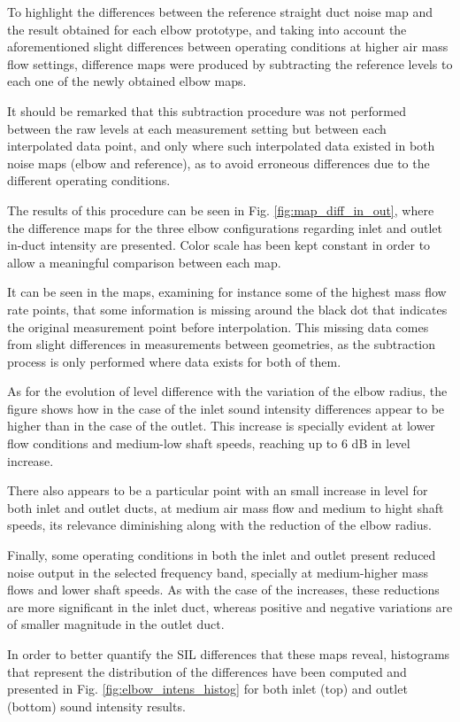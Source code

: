 To highlight the differences between the reference straight duct noise map and the result obtained for each elbow prototype, and taking into account the aforementioned slight differences between operating conditions at higher air mass flow settings, difference maps were produced by subtracting the reference levels to each one of the newly obtained elbow maps.

It should be remarked that this subtraction procedure was not performed between the raw levels at each measurement setting but between each interpolated data point, and only where such interpolated data existed in both noise maps (elbow and reference), as to avoid erroneous differences due to the different operating conditions. 

The results of this procedure can be seen in Fig. \ref{fig:map_diff_in_out}, where the difference maps for the three elbow configurations regarding inlet and outlet in-duct intensity are presented. Color scale has been kept constant in order to allow a meaningful comparison between each map.

It can be seen in the maps, examining for instance some of the highest mass flow rate points, that some information is missing around the black dot that indicates the original measurement point before interpolation. This missing data comes from slight differences in measurements between geometries, as the subtraction process is only performed where data exists for both of them.

As for the evolution of level difference with the variation of the elbow radius, the figure shows how in the case of the inlet sound intensity differences appear to be higher than in the case of the outlet. This increase is specially evident at lower flow conditions and medium-low shaft speeds, reaching up to 6 dB in level increase. 

There also appears to be a particular point with an small increase in level for both inlet and outlet ducts, at medium air mass flow and medium to hight shaft speeds, its relevance diminishing along with the reduction of the elbow radius.

Finally, some operating conditions in both the inlet and outlet present reduced noise output in the selected frequency band, specially at medium-higher mass flows and lower shaft speeds. As with the case of the increases, these reductions are more significant in the inlet duct, whereas positive and negative variations are of smaller magnitude in the outlet duct.

In order to better quantify the SIL differences that these maps reveal, histograms that represent the distribution of the differences have been computed and presented in Fig. \ref{fig:elbow_intens_histog} for both inlet (top) and outlet (bottom) sound intensity results.

